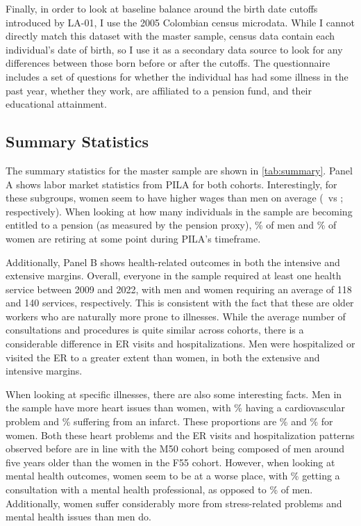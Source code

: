 \documentclass[12pt, a4paper]{article}
\begin{document}
Finally, in order to look at baseline balance around the birth date cutoffs introduced by LA-01, I use the 2005 Colombian census microdata. While I cannot directly match this dataset with the master sample, census data contain each individual's date of birth, so I use it as a secondary data source to look for any differences between those born before or after the cutoffs. The questionnaire includes a set of questions for whether the individual has had some illness in the past year, whether they work, are affiliated to a pension fund, and their educational attainment. 


\subsection{Summary Statistics}
The summary statistics for the master sample are shown in \autoref{tab:summary}. Panel A shows labor market statistics from PILA for both cohorts. Interestingly, for these subgroups, women seem to have higher wages than men on average (\wageF\ vs \wageM; respectively). When looking at how many individuals in the sample are becoming entitled to a pension (as measured by the pension proxy), \pensionM\% of men and \pensionF\% of women are retiring at some point during PILA's timeframe.

Additionally, Panel B shows health-related outcomes in both the intensive and extensive margins. Overall, everyone in the sample required at least one health service between 2009 and 2022, with men and women requiring an average of 118 and 140 services, respectively. This is consistent with the fact that these are older workers who are naturally more prone to illnesses. While the average number of consultations and procedures is quite similar across cohorts, there is a considerable difference in ER visits and hospitalizations. Men were hospitalized or visited the ER to a greater extent than women, in both the extensive and intensive margins.

When looking at specific illnesses, there are also some interesting facts. Men in the sample have more heart issues than women, with \cardiovascularM\% having a cardiovascular problem and \infarctM\% suffering from an infarct. These proportions are \cardiovascularF\% and \infarctF\% for women. Both these heart problems and the ER visits and hospitalization patterns observed before are in line with the M50 cohort being composed of men around five years older than the women in the F55 cohort. However, when looking at mental health outcomes, women seem to be at a worse place, with \conspsicoF\% getting a consultation with a mental health professional, as opposed to \conspsicoM\% of men. Additionally, women suffer considerably more from stress-related problems and mental health issues than men do.
\end{document}
